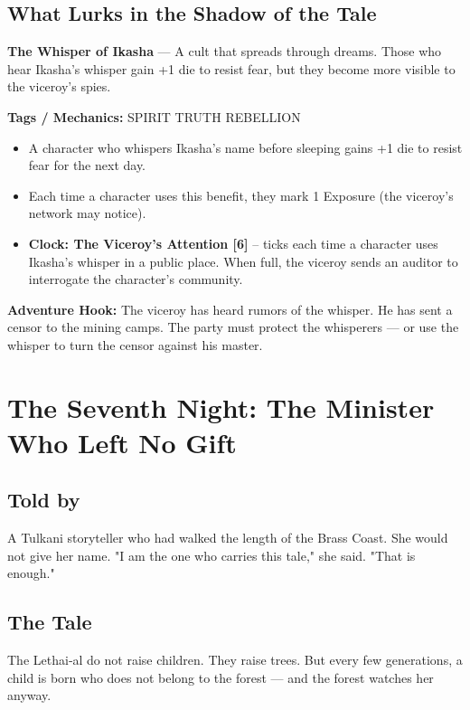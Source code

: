 \documentclass[10pt,twoside]{book}
\newcommand{\tag}[1]{\textsc{#1}}
\begin{document}
\section*{What Lurks in the Shadow of the Tale}
\begin{infobox}
\textbf{The Whisper of Ikasha} --- A cult that spreads through dreams. Those who hear Ikasha's whisper gain +1 die to resist fear, but they become more visible to the viceroy's spies.

\textbf{Tags / Mechanics:} \tag{SPIRIT} \tag{TRUTH} \tag{REBELLION}

\begin{itemize}
\item A character who whispers Ikasha's name before sleeping gains +1 die to resist fear for the next day.
\item Each time a character uses this benefit, they mark 1 Exposure (the viceroy's network may notice).
\item \textbf{Clock: The Viceroy's Attention [6]} -- ticks each time a character uses Ikasha's whisper in a public place. When full, the viceroy sends an auditor to interrogate the character's community.
\end{itemize}

\textbf{Adventure Hook:} The viceroy has heard rumors of the whisper. He has sent a censor to the mining camps. The party must protect the whisperers --- or use the whisper to turn the censor against his master.
\end{infobox}

\chapter{The Seventh Night: The Minister Who Left No Gift}

\section*{Told by}
A Tulkani storyteller who had walked the length of the Brass Coast. She would not give her name. "I am the one who carries this tale," she said. "That is enough."

\section*{The Tale}

The Lethai‑al do not raise children. They raise trees. But every few generations, a child is born who does not belong to the forest --- and the forest watches her anyway.
\end{document}
